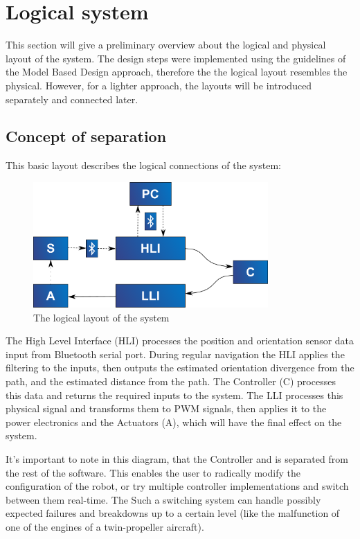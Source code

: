 \section{Logical system}

This section will give a preliminary overview about the logical and physical layout of the system. The design steps were implemented using the guidelines of the Model Based Design approach, therefore the the logical layout resembles the physical. However, for a lighter approach, the layouts will be introduced separately and connected later.

\subsection{Concept of separation}

This basic layout describes the logical connections of the system:

\begin{figure}[H]
	\centering
	\includegraphics[width=0.8\textwidth]{img2/LogicalLayout}
	\caption{The logical layout of the system}
	\label{fig:LogicalLayout}
\end{figure}

The High Level Interface (HLI) processes the position and orientation sensor data input from Bluetooth serial port. During regular navigation the HLI applies the filtering to the inputs, then outputs the estimated orientation divergence from the path, and the estimated distance from the path. The Controller (C) processes this data and returns the required inputs to the system. The LLI processes this physical signal and transforms them to PWM signals, then applies it to the power electronics and the Actuators (A), which will have the final effect on the system.

It’s important to note in this diagram, that the Controller and is separated from the rest of the software. This enables the user to radically modify the configuration of the robot, or try multiple controller implementations and switch between them real-time. The 
Such a switching system can handle possibly expected failures and breakdowns up to a certain level (like the malfunction of one of the engines of a twin-propeller aircraft).
